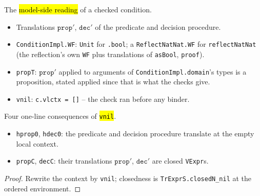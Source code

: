 \begin{definition}
  \label{prim-cond:struct:condition-wf}
  \leanok

   The \hl{model-side reading} of a checked condition.
  \begin{itemize}
  \item Translations $\mathtt{prop}'$, $\mathtt{dec}'$ of the predicate and decision procedure.
  \item \texttt{ConditionImpl.WF}: \texttt{Unit} for \texttt{.bool}; a \texttt{ReflectNatNat.WF}
    for \texttt{reflectNatNat} (the reflection's own \texttt{WF} plus translations of
    \texttt{asBool}, \texttt{proof}).
  \item \texttt{propT}: $\mathtt{prop}'$ applied to arguments of \texttt{ConditionImpl.domain}'s
    types is a proposition, stated applied since that is what the checks give.
  \item \texttt{vnil}: \texttt{c.vlctx = []} -- the check ran before any binder.
  \end{itemize}
\end{definition}

\begin{lemma}
  \label{prim-cond:family:condition-wf-projections}
  \leanok

   Four one-line consequences of \hl{\texttt{vnil}}.
  \begin{itemize}
  \item \texttt{hprop0}, \texttt{hdec0}: the predicate and decision procedure translate at the
    empty local context.
  \item \texttt{propC}, \texttt{decC}: their translations $\mathtt{prop}'$, $\mathtt{dec}'$ are
    closed \texttt{VExpr}s.
  \end{itemize}
\end{lemma}
\begin{proof}
  \leanok
   Rewrite the context by \texttt{vnil}; closedness is \texttt{TrExprS.closedN\_nil} at
  the ordered environment.
\end{proof}

